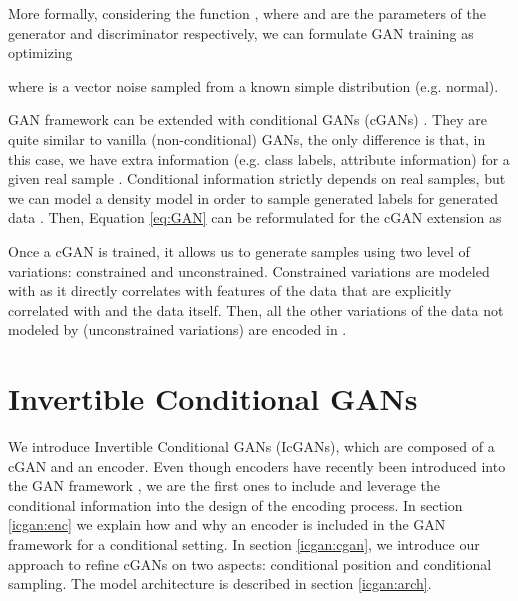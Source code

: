 \documentclass{article}
\begin{document}
More formally, considering the function , where  and  are the parameters of the generator  and discriminator  respectively, we can formulate GAN training as optimizing


where  is a vector noise sampled from a known simple distribution  (e.g. normal).
 
GAN framework can be extended with conditional GANs (cGANs) \citep{Mirza2014}. They are quite similar to vanilla (non-conditional) GANs, the only difference is that, in this case, we have extra information  (e.g. class labels, attribute information) for a given real sample . Conditional information strictly depends on real samples, but we can model a density model  in order to sample generated labels  for generated data . Then, Equation \ref{eq:GAN} can be reformulated for the cGAN extension as

 



Once a cGAN is trained, it allows us to generate samples using two level of variations: constrained and unconstrained. Constrained variations are modeled with  as it directly correlates with features of the data that are explicitly correlated with  and the data itself. Then, all the other variations of the data not modeled by  (unconstrained variations) are encoded in .
 
\section{Invertible Conditional GANs} \label{sec:IcGANs}
We introduce Invertible Conditional GANs (IcGANs), which are composed of a cGAN and an encoder. Even though encoders have recently been introduced into the GAN framework \cite{Dumoulin2016,Donahue2016,Reed2016}, we are the first ones to include and leverage the conditional information  into the design of the encoding process. In section \ref{icgan:enc} we explain how and why an encoder is included in the GAN framework for a conditional setting. In section \ref{icgan:cgan}, we introduce our approach to refine cGANs on two aspects: conditional position and conditional sampling. The model architecture is described in section \ref{icgan:arch}.
\end{document}

